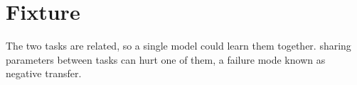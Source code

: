 \section{Fixture}
The two tasks are related, so a single model could learn them together.
sharing parameters between tasks can hurt one of them, a failure mode known as
negative transfer.
